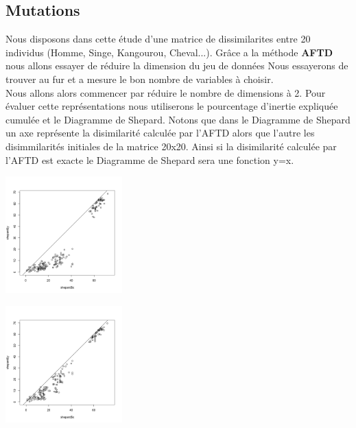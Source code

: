 \documentclass[10pt]{article}
\begin{document}
	
	\subsection{Mutations}
	Nous disposons dans cette étude  d'une matrice de dissimilarites entre 20 individus (Homme, Singe, Kangourou, Cheval...). Grâce a la méthode \textbf{AFTD} nous allons essayer de réduire la dimension du jeu de données Nous essayerons de trouver au fur et a mesure le bon nombre de variables à choisir.\\ Nous allons alors commencer par réduire le nombre de dimensions à 2. Pour évaluer cette représentations nous utiliserons le pourcentage d'inertie  expliquée cumulée et le  Diagramme de Shepard.  Notons que dans le Diagramme de Shepard un axe représente la disimilarité calculée par l'AFTD alors que l'autre les disimmilarités initiales de la matrice 20x20. Ainsi si la disimilarité calculée par l'AFTD est exacte le Diagramme de Shepard sera une fonction y=x.
	
			\begin{minipage}{.5\textwidth}
		\includegraphics[width=45mm]{Figures/Mutations2_1/shepard2.png}
		\label{fig:shepard2}
	\end{minipage}%
	\hspace{0.02\linewidth}
	\begin{minipage}{.5\textwidth}
		\includegraphics[width=45mm]{Figures/Mutations2_1/shepard3.png}
		\label{fig:shepard3}
	\end{minipage}
	\vspace{0.2mm}
	
\end{document}
